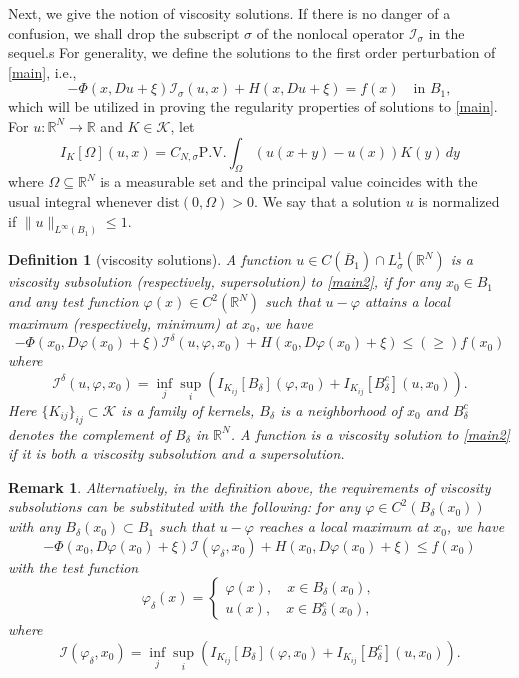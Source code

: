 \documentclass[11pt,reqno]{amsart}
\numberwithin{equation}{section}
\newtheorem{definition}[theorem]{Definition}
\newtheorem{remark}[theorem]{Remark}
\begin{document}
Next, we give the notion of viscosity solutions. If there is no danger of a confusion, we shall drop the subscript $\sigma$ of the nonlocal operator $\mathcal{I}_\sigma$ in the sequel.s
For generality, we define the solutions to the first order perturbation of \eqref{main}, i.e.,
\begin{equation}
\label{main2}
-\Phi(x,Du+\xi)\mathcal{I}_\sigma(u,x)+H(x,Du+\xi)=f(x) \quad\text{in }  B_1, %
\end{equation}
which will be utilized in proving the regularity properties of solutions to \eqref{main}.
For $u:\mathbb{R}^N\rightarrow\mathbb{R}$ and $K\in\mathcal{K}$, let
$$
I_{K}[\Omega](u,x)=C_{N,\sigma}\mathrm{P.V.}\int_\Omega(u(x+y)-u(x))K(y)\,dy
$$
where $\Omega\subseteq\mathbb{R}^N$ is a measurable set and the principal value coincides with the usual integral whenever $\mathrm{dist}(0,\Omega)>0$.
We say that a solution $u$ is normalized if $\|u\|_{L^\infty(B_1)}\le1$.%

\begin{definition}[viscosity solutions]
\label{def1}
A function $u\in C(\overline{B}_1)\cap L^1_\sigma(\mathbb{R}^N)$ is a viscosity subsolution (respectively, supersolution) to \eqref{main2},
if for any $x_0\in B_1$ and any test function $\varphi(x)\in C^2(\mathbb{R}^N)$ such that $u-\varphi$ attains a local maximum (respectively, minimum) at $x_0$, we have
$$
-\Phi(x_0,D\varphi(x_0)+\xi)\mathcal{I}^\delta(u,\varphi,x_0)+H(x_0,D\varphi(x_0)+\xi)\le (\ge) f(x_0)
$$
where
$$
\mathcal{I}^\delta(u,\varphi,x_0)=\inf_j\sup_i\left(I_{K_{ij}}[B_\delta](\varphi,x_0)+I_{K_{ij}}[B^c_\delta](u,x_0)\right).
$$
Here $\{K_{ij}\}_{ij}\subset \mathcal{K}$ is a family of kernels, $B_\delta$ is a neighborhood of $x_0$ and $B^c_\delta$ denotes the complement of $B_\delta$ in $\mathbb{R}^N$.
A function is a viscosity solution to \eqref{main2} if it is both a viscosity subsolution and a supersolution.
\end{definition}

\begin{remark}
Alternatively, in the definition above, the requirements of viscosity subsolutions can be substituted with the following: for any $\varphi\in C^2(B_\delta(x_0))$ with any $B_\delta(x_0)\subset B_1$ such that $u-\varphi$ reaches a local maximum at $x_0$, we have
$$
-\Phi(x_0,D\varphi(x_0)+\xi)\mathcal{I}(\varphi_\delta,x_0)+H(x_0,D\varphi(x_0)+\xi)\le f(x_0)
$$
with the test function
\begin{equation*}
\varphi_\delta(x)=\begin{cases}\varphi(x), \quad x\in B_\delta(x_0),\\
u(x),  \quad x\in B^c_\delta(x_0),
\end{cases}
\end{equation*}
where
$$
\mathcal{I}(\varphi_\delta,x_0)=\inf_j\sup_i\left(I_{K_{ij}}[B_\delta](\varphi,x_0)+I_{K_{ij}}[B^c_\delta](u,x_0)\right).
$$
\end{remark}
\end{document}
